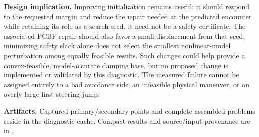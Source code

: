 \documentclass[10pt]{article}
\begin{document}
\textbf{Design implication.} Improving initialization remains useful: it should
respond to the requested margin and reduce the repair needed at the predicted
encounter while retaining its role as a search seed. It need not be a safety
certificate. The associated PCBF repair should also favor a small displacement
from that seed; minimizing safety slack alone does not select the smallest
nonlinear-model perturbation among equally feasible results. Such changes could
help provide a convex-feasible, model-accurate damping base, but no proposed
change is implemented or validated by this diagnostic. The measured failure
cannot be assigned entirely to a bad avoidance side, an infeasible physical
maneuver, or an overly large first steering jump.

\textbf{Artifacts.} Captured primary/secondary points and complete assembled
problems reside in the diagnostic cache. Compact results and source/input
provenance are in .
\end{document}
